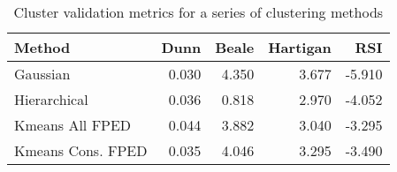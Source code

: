\begin{table}[h]
\caption{Cluster validation metrics for a series of clustering methods}
\label{tab:cluster_metrics}
\begin{tabular}{lrrrr}
\toprule
Method & Dunn & Beale & Hartigan & RSI \\
\midrule
Gaussian & 0.030 & 4.350 & 3.677 & -5.910 \\
Hierarchical & 0.036 & 0.818 & 2.970 & -4.052 \\
Kmeans All FPED & 0.044 & 3.882 & 3.040 & -3.295 \\
Kmeans Cons. FPED & 0.035 & 4.046 & 3.295 & -3.490 \\
\bottomrule
\end{tabular}
\end{table}
